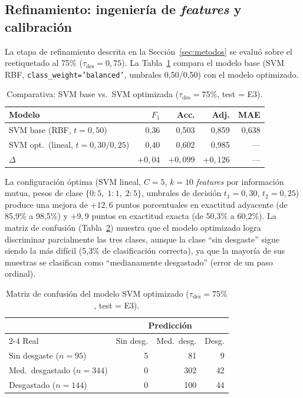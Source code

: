\documentclass[10pt,twocolumn]{article}
\begin{document}
\subsection{Refinamiento: ingeniería de \textit{features} y calibración}
\label{sec:refinamiento}

La etapa de refinamiento descrita en la Sección~\ref{sec:metodos} se
evaluó sobre el reetiquetado al 75\% ($\tau_{\text{des}} = 0{,}75$). La
Tabla~\ref{tab:refinamiento} compara el modelo base (SVM RBF,
\texttt{class\_weight='balanced'}, umbrales 0{,}50/0{,}50) con el modelo
optimizado.

\begin{table}[htbp]
\centering
\caption{Comparativa: SVM base vs.\ SVM optimizada
  ($\tau_{\text{des}} = 75\%$, test = E3).}
\label{tab:refinamiento}
\footnotesize
\begin{tabular}{@{}lrrrr@{}}
\toprule
Modelo & {$F_1$} & {Acc.} & {Adj.} & {MAE} \\
\midrule
SVM base (RBF, $t = 0{,}50$)   & 0{,}36 & 0{,}503 & 0{,}859 & 0{,}638 \\
SVM opt.\ (lineal, $t = 0{,}30/0{,}25$) & 0{,}40 & 0{,}602 & 0{,}985 & --- \\
\midrule
$\Delta$ & {$+0{,}04$} & {$+0{,}099$} & {$+0{,}126$} & --- \\
\bottomrule
\end{tabular}
\end{table}

La configuración óptima (SVM lineal, $C = 5$, $k = 10$ \textit{features}
por información mutua, pesos de clase $\{0{:}5,\; 1{:}1,\; 2{:}5\}$,
umbrales de decisión $t_1 = 0{,}30$, $t_2 = 0{,}25$) produce una mejora
de $+12{,}6$ puntos porcentuales en exactitud adyacente (de 85{,}9\% a
98{,}5\%) y $+9{,}9$ puntos en exactitud exacta (de 50{,}3\% a 60{,}2\%).
La matriz de confusión (Tabla~\ref{tab:cm_opt}) muestra que el modelo
optimizado logra discriminar parcialmente las tres clases, aunque la
clase ``sin desgaste'' sigue siendo la más difícil (5{,}3\% de
clasificación correcta), ya que la mayoría de sus muestras se clasifican
como ``medianamente desgastado'' (error de un paso ordinal).

\begin{table}[htbp]
\centering
\caption{Matriz de confusión del modelo SVM optimizado
  ($\tau_{\text{des}} = 75\%$, test = E3).}
\label{tab:cm_opt}
\footnotesize
\begin{tabular}{@{}l*{3}{r}@{}}
\toprule
& \multicolumn{3}{c}{Predicción} \\
\cmidrule(lr){2-4}
Real & {Sin desg.} & {Med.\ desg.} & {Desg.} \\
\midrule
Sin desgaste ($n = 95$) & 5 & 81 & 9 \\
Med.\ desgastado ($n = 344$) & 0 & 302 & 42 \\
Desgastado ($n = 144$) & 0 & 100 & 44 \\
\bottomrule
\end{tabular}
\end{table}
\end{document}
